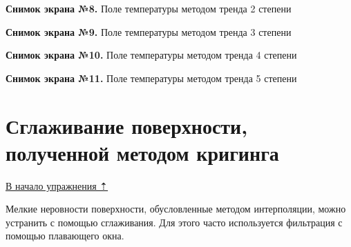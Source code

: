 \documentclass[12pt,]{book}
\begin{document}
\textbf{Снимок экрана №8.} Поле температуры методом тренда 2 степени

\textbf{Снимок экрана №9.} Поле температуры методом тренда 3 степени

\textbf{Снимок экрана №10.} Поле температуры методом тренда 4 степени

\textbf{Снимок экрана №11.} Поле температуры методом тренда 5 степени

\hypertarget{interpolation-smoothing}{%
\section{Сглаживание поверхности, полученной методом кригинга}\label{interpolation-smoothing}}

\protect\hyperlink{interpolation}{В начало упражнения ⇡}

Мелкие неровности поверхности, обусловленные методом интерполяции, можно устранить с помощью сглаживания. Для этого часто используется фильтрация с помощью плавающего окна.
\end{document}
